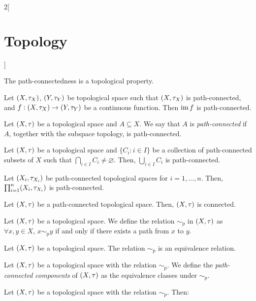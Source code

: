 \documentclass[../../../main.tex]{subfiles}
\begin{document}
\begin{multicols}{2}[\section{Topology}]
\begin{definition}
  \end{definition}
  \begin{prop}
    The path-connectedness is a topological property.
  \end{prop}
  \begin{prop}
    Let $(X,\tau_X)$, $(Y,\tau_Y)$ be topological space such that $(X,\tau_X)$ is path-connected, and $f:(X,\tau_X)\rightarrow(Y,\tau_Y)$ be a continuous function. Then $\operatorname{im} f$ is path-connected.
  \end{prop}
  \begin{definition}
    Let $(X,\tau)$ be a topological space and $A\subseteq X$. We say that $A$ is \emph{path-connected} if $A$, together with the subspace topology, is path-connected.
  \end{definition}
  \begin{prop}
    Let $(X,\tau)$ be a topological space and $\{C_i:i\in I\}$ be a collection of path-connected subsets of $X$ such that $\bigcap_{i\in I} C_i\ne\varnothing$. Then, $\bigcup_{i\in I} C_i$ is path-connected.
  \end{prop}
  \begin{theorem}
    Let $(X_i,\tau_{X_i})$ be path-connected topological spaces for $i=1,\ldots,n$. Then, $\prod_{i=1}^n(X_i,\tau_{X_i})$ is path-connected.
  \end{theorem}
  \begin{theorem}
    Let $(X,\tau)$ be a path-connected topological space. Then, $(X,\tau)$ is connected.
  \end{theorem}
  \begin{definition}
    Let $(X,\tau)$ be a topological space. We define the relation $\sim_\text{p}$ in $(X,\tau)$ as $\forall x,y\in X$, $x\sim_\text{p} y$ if and only if there exists a path from $x$ to $y$.
  \end{definition}
  \begin{prop}
    Let $(X,\tau)$ be a topological space. The relation $\sim_\text{p}$ is an equivalence relation.
  \end{prop}
  \begin{definition}
    Let $(X,\tau)$ be a topological space with the relation $\sim_\text{p}$. We define the \emph{path-connected components} of $(X,\tau)$ as the equivalence classes under $\sim_\text{p}$.
  \end{definition}
  \begin{prop}
    Let $(X,\tau)$ be a topological space with the relation $\sim_\text{p}$. Then:
    \begin{enumerate}

\end{enumerate}
\end{prop}
\end{multicols}
\end{document}
